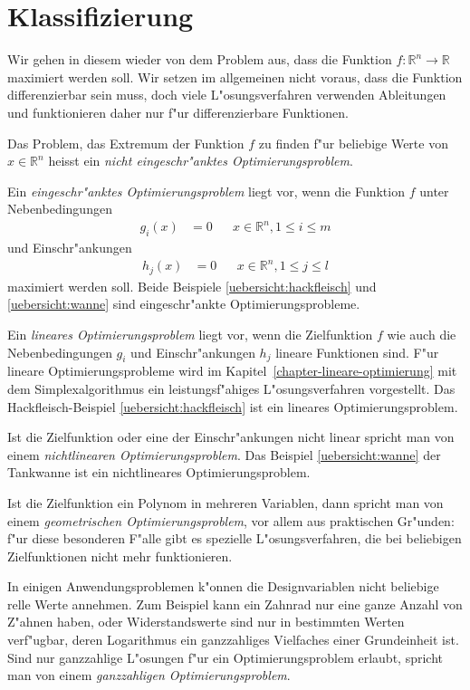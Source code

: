 \section{Klassifizierung \label{section-klassifizierung}}
Wir gehen in diesem wieder von dem Problem aus, dass die Funktion
$f\colon\mathbb R^n\to\mathbb R$ maximiert werden soll.
Wir setzen im allgemeinen nicht voraus, dass die Funktion differenzierbar
sein muss, doch viele L"osungsverfahren verwenden Ableitungen und 
funktionieren daher nur f"ur differenzierbare Funktionen.

Das Problem, das Extremum der Funktion $f$ zu finden f"ur beliebige
Werte von $x\in\mathbb R^n$ heisst ein {\em nicht eingeschr"anktes
Optimierungsproblem}.


Ein {\em eingeschr"anktes Optimierungsproblem} liegt vor, wenn die
Funktion $f$ unter
Nebenbedingungen 
\begin{align*}
g_i(x)&=0&&x\in\mathbb R^n, 1\le i\le m
\end{align*}
und Einschr"ankungen
\begin{align*}
h_j(x)&=0&&x\in\mathbb R^n, 1\le j\le l
\end{align*}
maximiert werden soll. Beide Beispiele \ref{uebersicht:hackfleisch}
und \ref{uebersicht:wanne} sind eingeschr"ankte Optimierungsprobleme.

Ein {\em lineares Optimierungsproblem} liegt vor, wenn die
Zielfunktion $f$ wie auch die Nebenbedingungen $g_i$ und
Einschr"ankungen $h_j$ lineare Funktionen sind.
F"ur lineare Optimierungsprobleme wird im
Kapitel~\ref{chapter-lineare-optimierung} mit dem Simplexalgorithmus
ein leistungsf"ahiges L"osungsverfahren vorgestellt.
Das Hackfleisch-Beispiel \ref{uebersicht:hackfleisch} ist ein lineares
Optimierungsproblem.

Ist die Zielfunktion oder eine der Einschr"ankungen nicht linear
spricht man von einem {\em nichtlinearen Optimierungsproblem}.
Das Beispiel \ref{uebersicht:wanne} der Tankwanne ist ein nichtlineares
Optimierungsproblem.

Ist die Zielfunktion ein Polynom in mehreren Variablen, dann spricht
man von einem {\em geometrischen Optimierungsproblem}, vor allem
aus praktischen Gr"unden: f"ur diese besonderen F"alle gibt es 
spezielle L"osungsverfahren, die bei beliebigen Zielfunktionen
nicht mehr funktionieren.

In einigen Anwendungsproblemen k"onnen die Designvariablen nicht beliebige
relle Werte annehmen. Zum Beispiel kann ein Zahnrad nur eine ganze Anzahl
von Z"ahnen haben, oder Widerstandswerte sind nur in bestimmten Werten
verf"ugbar, deren Logarithmus ein ganzzahliges Vielfaches einer
Grundeinheit ist. Sind nur ganzzahlige L"osungen f"ur ein Optimierungsproblem
erlaubt, spricht man von einem {\em ganzzahligen Optimierungsproblem}.

